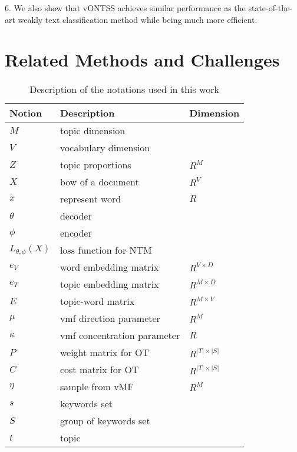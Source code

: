 \documentclass[11pt]{article}
\begin{document}
6. We also show that vONTSS achieves similar performance as the state-of-the-art weakly text classification method while being much more efficient.








\section{Related Methods and Challenges}
 
 

\begin{table}[t]
\caption{Description of the notations used in this work}
\label{sample-table}

\vskip 0.15in

\begin{center}
\begin{small}
\scalebox{0.85} {
\begin{tabular}{lll}
\toprule
Notion & Description & Dimension\\
\hline
\midrule
$M$ & topic dimension  & \\
$V$ & vocabulary dimension  & \\
$Z$ & topic proportions  & $R^{M}$\\
$X$ & bow of a document  & $R^{V}$\\
$x$ & represent word &  $R$\\
$\theta$ & decoder  & \\
$\phi$ & encoder  & \\
$L_{\theta, \phi}(X)$ & loss function for NTM & \\
$e_{V}$ & word embedding matrix & $R^{V \times D}$\\
$e_{T}$ & topic embedding matrix & $R^{M \times D}$\\
$E$ &  topic-word matrix & $R^{M \times V}$\\
$\mu$ & vmf direction parameter   &$R^{M}$ \\
$\kappa$ &vmf concentration parameter  & $R$\\
$P$ & weight matrix for OT  & $R^{|T| \times |S|}$\\
$C$ & cost matrix for OT  & $R^{|T| \times |S|}$\\
$\eta$ & sample from vMF & $R^{M}$\\
$s$ & keywords set & \\
$S$ & group of keywords set & \\
$t$ & topic & \\

\end{tabular}}
\end{small}
\end{center}
\end{table}
\end{document}
